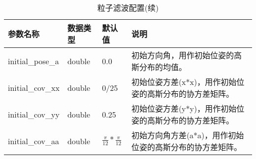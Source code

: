   \begin{table}[th]
    \caption{粒子滤波配置(续)}  
    \begin{center}  
    \begin{tabular}{|l|l|l|p{8cm}|}  
    \hline  
    参数名称 & 数据类型 & 默认值 & 说明  \\ \hline  
    

    initial\_pose\_a & double & 0.0 & 初始方向角，用作初始位姿的高斯分布的均值。 \\  \hline  
    initial\_cov\_xx & double & 0/25 & 初始位姿方差(x*x)，用作初始位姿的高斯分布的协方差矩阵。 \\  \hline  
    initial\_cov\_yy & double & 0.25 & 初始位姿方差(y*y)，用作初始位姿的高斯分布的协方差矩阵。 \\  \hline 
    initial\_cov\_aa & double & $\frac{\pi}{12} * \frac{\pi}{12}$ & 初始方向角方差(a*a)，用作初始位姿的高斯分布的协方差矩阵。 \\  \hline  
    \end{tabular}  
    \end{center}  
    \end{table} 

